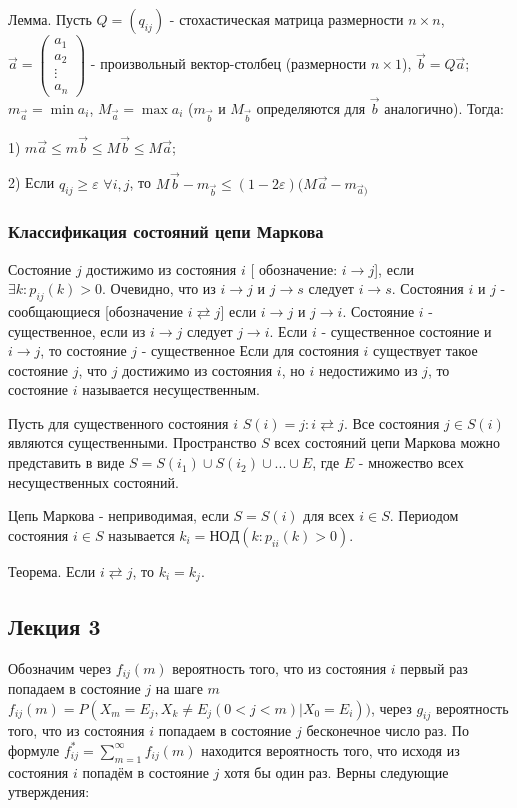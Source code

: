 Лемма. Пусть $Q=(q_{ij})$ - стохастическая матрица размерности $n \times n$,
$
	\vec{a} = \begin{pmatrix}
		a_1    \\
		a_2    \\
		\vdots \\
		a_n
	\end{pmatrix}
$ - произвольный вектор-столбец (размерности $n \times 1$), $\vec{b}=Q\vec{a}$; $m_{\vec{a}}=\min a_i$, $M_{\vec{a}}=\max a_i$ ($m_{\vec{b}}$ и $M_{\vec{b}}$ определяются для $\vec{b}$ аналогично).
Тогда:

1) $m\vec{a}\leq m\vec{b} \leq M\vec{b} \leq M\vec{a}$;

2) Если $q_{ij} \geq \varepsilon$ $\forall i,j$, то $M_{}\vec{b}-m_{\vec{b}} \leq  (1-2\varepsilon) (M_{}\vec{a}-m_{\vec{a})}$

\subsubsection*{Классификация состояний цепи Маркова}

Состояние $j$ достижимо из состояния $i$ [ обозначение: $i \to j$], если $\exists k: p_{ij}(k)>0$.
Очевидно, что из $i \to j$ и $j \to s$ следует $i \to s$.
Состояния $i$ и $j$ - сообщающиеся [обозначение $i \rightleftarrows j$] если $i \to j$ и $j \to i$.
Состояние $i$ - существенное, если из $i \to j$ следует $j \to i$.
Если $i$ - существенное состояние и $i \to j$, то состояние $j$ - существенное
Если для состояния $i$ существует такое состояние $j$, что $j$ достижимо из состояния $i$, но $i$ недостижимо из $j$, то состояние $i$ называется несущественным.

Пусть для существенного состояния $i$ $S(i)={j:i \rightleftarrows j}$. Все состояния $j\in S(i)$ являются существенными. Пространство $S$ всех состояний цепи Маркова можно представить в виде $S=S(i_1)\cup S(i_2)\cup ...\cup E$, где $E$ - множество всех несущественных состояний.

Цепь Маркова - неприводимая, если $S=S(i)$ для всех $i\in S$. Периодом состояния $i\in S$ называется $k_i=НОД(k: p_{ii}(k)>0)$.

Теорема. Если $i \rightleftarrows j$, то $k_i=k_j$.

\subsection{Лекция 3}

Обозначим через $f_{ij}(m)$ вероятность того, что из состояния $i$ первый раз попадаем в состояние $j$ на шаге $m$
$f_{ij}(m)=P(X_m=E_j,X_k\ne E_j (0<j<m) | X_0 =E_i))$, через $g_{ij}$ вероятность того, что из состояния $i$ попадаем в состояние $j$ бесконечное число раз. По формуле $f^*_{ij}=\sum_{m=1}^\infty f_{ij}(m)$ находится вероятность того, что исходя из состояния $i$ попадём в состояние $j$ хотя бы один раз.
Верны следующие утверждения:

